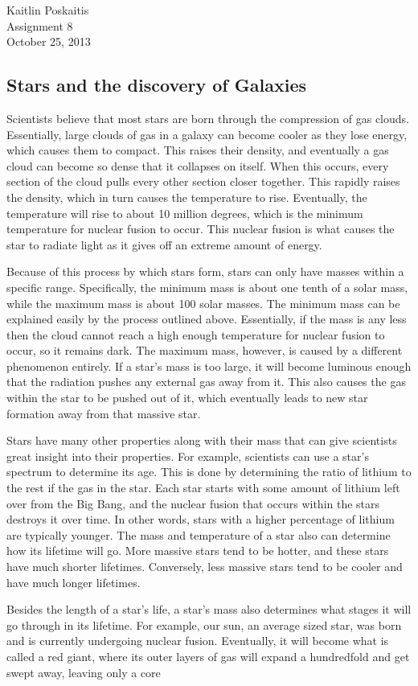 \documentclass[12pt]{article}
\begin{document}
\noindent Kaitlin Poskaitis\\
Assignment 8\\
October 25, 2013
\begin{center}
    \section*{\bf Stars and the discovery of Galaxies}
\end{center}


Scientists believe that most stars are born through the compression of gas
clouds.  Essentially, large clouds of gas in a galaxy can become cooler as they
lose energy, which causes them to compact.  This raises their density, and
eventually a gas cloud can become so dense that it collapses on itself.  When
this occurs, every section of the cloud pulls every other section closer
together.  This rapidly raises the density, which in turn causes the temperature
to rise.  Eventually, the temperature will rise to about 10 million degrees,
which is the minimum temperature for nuclear fusion to occur.  This nuclear
fusion is what causes the star to radiate light as it gives off an extreme
amount of energy.

Because of this process by which stars form, stars can only have masses within a
specific range.  Specifically, the minimum mass is about one tenth of a solar
mass, while the maximum mass is about 100 solar masses.  The minimum mass can be
explained easily by the process outlined above.  Essentially, if the mass is any
less then the cloud cannot reach a high enough temperature for nuclear fusion to
occur, so it remains dark.  The maximum mass, however, is caused by a different
phenomenon entirely.  If a star's mass is too large, it will become luminous
enough that the radiation pushes any external gas away from it.  This also
causes the gas within the star to be pushed out of it, which eventually leads to
new star formation away from that massive star.

Stars have many other properties along with their mass that can give scientists
great insight into their properties.  For example, scientists can use a star's
spectrum to determine its age.  This is done by determining the ratio of lithium
to the rest if the gas in the star.  Each star starts with some amount of
lithium left over from the Big Bang, and the nuclear fusion that occurs within
the stars destroys it over time.  In other words, stars with a higher percentage
of lithium are typically younger.  The mass and temperature of a star also can
determine how its lifetime will go.  More massive stars tend to be hotter, and
these stars have much shorter lifetimes.  Conversely, less massive stars tend to
be cooler and have much longer lifetimes.

Besides the length of a star's life, a star's mass also determines what stages
it will go through in its lifetime.  For example, our sun, an average sized star,
was born and is currently undergoing nuclear fusion.  Eventually, it will become
what is called a red giant, where its outer layers of gas will expand a
hundredfold and get swept away, leaving only a core 
\end{document}
